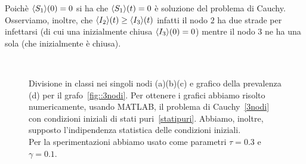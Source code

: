 Poich\`e $\langle S_1 \rangle(0)=0$ si ha che $\langle S_1 \rangle(t)=0$ \`e soluzione del problema di Cauchy.  Osserviamo,  inoltre, che $\langle I_2 \rangle(t)\geq \langle I_3 \rangle(t)$ infatti il nodo $2$ ha due strade per infettarsi (di cui una inizialmente chiusa $\langle I_3 \rangle(0)=0$) mentre il nodo $3$ ne ha una sola (che inizialmente \`e chiusa). 
\begin{figure}[ht]
\centering
\subfloat[][Nodo 1]{}
\subfloat[][Nodo 2]{}
\\
\subfloat[][Nodo 3]{}
\subfloat[][Prevalenza]{}
\caption[Sperimentazione in MATLAB relativo al grafo~\ref{fig::3nodi}]{Divisione in classi nei singoli nodi (a)(b)(c) e grafico della prevalenza (d) per il grafo~\ref{fig::3nodi}.   Per ottenere i grafici abbiamo risolto numericamente,  usando MATLAB,  il problema di Cauchy~\eqref{3nodi} con condizioni iniziali  di stati puri~\eqref{statipuri}. Abbiamo,  inoltre,  supposto l'indipendenza statistica delle condizioni iniziali.\\
Per la sperimentazioni abbiamo usato come parametri $\tau= 0.3$ e $\gamma =0.1 $.}\label{fig::spe3nodi}
\end{figure}




